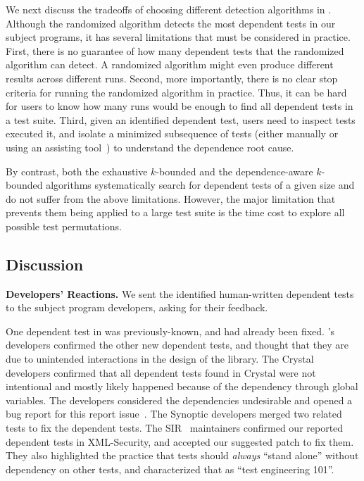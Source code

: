 We next discuss the tradeoffs of choosing different detection
algorithms in \ourtool. Although the randomized algorithm
detects the most dependent tests in our subject programs,
it has several limitations that must be considered
in practice. First, there is no guarantee of how many
dependent tests that the randomized algorithm can detect. A randomized
algorithm might even produce different results across different runs.
Second, more importantly, there is no clear stop criteria
for running the randomized algorithm in practice.
Thus, it can be hard for users
to know how many runs would be enough to find all dependent tests in a test suite.
Third, given an identified dependent test, users
need to inspect tests executed it, and isolate a minimized
subsequence of tests (either
manually or using an assisting tool~\cite{Zeller:2002}) to understand the dependence root cause.

By contrast, both the exhaustive $k$-bounded and the depend\-ence-aware
$k$-bounded algorithms systematically search for dependent
tests of a given size and do not suffer from the above limitations.
However, the major limitation that prevents them being applied to a
large test suite is the time cost to
explore all possible test permutations.





\subsection{Discussion}
\label{sec:expdiscussion}


\noindent \textbf{Developers' Reactions.}
We sent the identified human-written dependent tests to the
subject program developers, asking for their feedback.

One dependent test in \jt was previously-known,
and had already been fixed. \jt's
developers confirmed the other new dependent
tests, and thought that they are due to unintended interactions
in the design of the library.
%
The Crystal developers confirmed that all dependent tests
found in Crystal were not intentional and mostly likely
happened because of the dependency
through global variables. The developers considered the
dependencies undesirable and opened a bug report for
this report issue~\cite{crystalbugreport}.
%
The Synoptic developers merged two related tests to fix
the dependent tests.
%
The SIR~\cite{sir} maintainers confirmed our reported dependent
tests in XML-Security, and accepted our
suggested patch to fix them. They also highlighted the practice
that tests should \textit{always} ``stand alone''
without dependency on other tests, and characterized that as
``test engineering 101''. 

